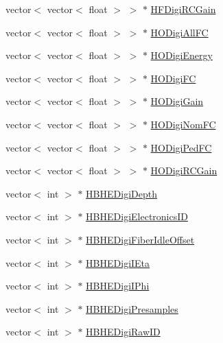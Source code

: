 \begin{DoxyCompactItemize}
\item 
vector$<$ vector$<$ float $>$ $>$ $\ast$ \hyperlink{class_hcal_tuple_tree_a9cc44ef6fd299d20874e0b07eb68b94c}{H\+F\+Digi\+R\+C\+Gain}
\item 
vector$<$ vector$<$ float $>$ $>$ $\ast$ \hyperlink{class_hcal_tuple_tree_afe37a056626eef4c965a339b420171a9}{H\+O\+Digi\+All\+F\+C}
\item 
vector$<$ vector$<$ float $>$ $>$ $\ast$ \hyperlink{class_hcal_tuple_tree_a379a809505a4af9fbdd8ed073cdadebf}{H\+O\+Digi\+Energy}
\item 
vector$<$ vector$<$ float $>$ $>$ $\ast$ \hyperlink{class_hcal_tuple_tree_a285842d23b6b8d21ebed868753ee1e68}{H\+O\+Digi\+F\+C}
\item 
vector$<$ vector$<$ float $>$ $>$ $\ast$ \hyperlink{class_hcal_tuple_tree_ab3d383dc83018d2bc4e468a40af05787}{H\+O\+Digi\+Gain}
\item 
vector$<$ vector$<$ float $>$ $>$ $\ast$ \hyperlink{class_hcal_tuple_tree_a56ee5bb65a6e34d5b0934fad381f2015}{H\+O\+Digi\+Nom\+F\+C}
\item 
vector$<$ vector$<$ float $>$ $>$ $\ast$ \hyperlink{class_hcal_tuple_tree_af4ae835aebd4b9754cde9868afed4d7d}{H\+O\+Digi\+Ped\+F\+C}
\item 
vector$<$ vector$<$ float $>$ $>$ $\ast$ \hyperlink{class_hcal_tuple_tree_a760900f2eccc37b9c8efc78b6af457fa}{H\+O\+Digi\+R\+C\+Gain}
\item 
vector$<$ int $>$ $\ast$ \hyperlink{class_hcal_tuple_tree_ae5ed39ea705aff8363edefc34423426e}{H\+B\+H\+E\+Digi\+Depth}
\item 
vector$<$ int $>$ $\ast$ \hyperlink{class_hcal_tuple_tree_a030e840a1ceb41ce84181c68926aa948}{H\+B\+H\+E\+Digi\+Electronics\+I\+D}
\item 
vector$<$ int $>$ $\ast$ \hyperlink{class_hcal_tuple_tree_aaf4a8badc474e66b2f2918cfd80b5a2a}{H\+B\+H\+E\+Digi\+Fiber\+Idle\+Offset}
\item 
vector$<$ int $>$ $\ast$ \hyperlink{class_hcal_tuple_tree_ac80f55cd8338af07ad6e76357e2bdc02}{H\+B\+H\+E\+Digi\+I\+Eta}
\item 
vector$<$ int $>$ $\ast$ \hyperlink{class_hcal_tuple_tree_af201c74f0517d348fcbe767c156139f2}{H\+B\+H\+E\+Digi\+I\+Phi}
\item 
vector$<$ int $>$ $\ast$ \hyperlink{class_hcal_tuple_tree_aa12edf8c843903084ea22da932cea02b}{H\+B\+H\+E\+Digi\+Presamples}
\item 
vector$<$ int $>$ $\ast$ \hyperlink{class_hcal_tuple_tree_a79e823d5bf62909c8bebc784f6a8ceb9}{H\+B\+H\+E\+Digi\+Raw\+I\+D}

\end{DoxyCompactItemize}
